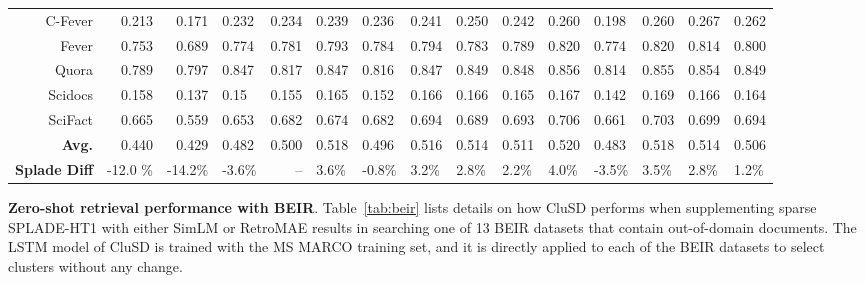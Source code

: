 \begin{table*}[h]
{\begin{tabular}{r r r lr  |lllll|lllll}
                {C-Fever}	& 0.213 & 0.171  &  0.232&0.234 & {0.239} &0.236&  0.241 & 0.250 & 0.242 & 0.260 &0.198 &0.260 &0.267& 0.262\\
                {Fever} & 0.753  &0.689  &	 0.774& {0.781} & 0.793 &0.784&  0.794 & 0.783 & 0.789 & 0.820 &0.774 &0.820 &0.814& 0.800\\
                {Quora} & 0.789 & 0.797  &	 0.847&0.817 &	0.847 &0.816&  0.847 & 0.849 &0.848 & 0.856 &0.814 &0.855 &0.854& 0.849\\
                {Scidocs}	& 0.158 &0.137  &	 0.15&0.155 &	{0.165} &0.152&  0.166 & 0.166 & 0.165 & 0.167 &0.142 &0.169&0.166& 0.164\\
                {SciFact}	& 0.665 & 0.559  &  0.653& {0.682} & 0.674 &0.682&  0.694 & 0.689 & 0.693 & 0.706  &0.661 &0.703 &0.699& 0.694\\
                            \hline
                \textbf{Avg.} & 0.440 & 0.429  &  0.482&0.500 & 0.518 &0.496&  0.516 & 0.514 & 0.511 & 0.520 &0.483 &0.518 &0.514& 0.506\\
                \textbf{{Splade Diff}} & -12.0 \% &  -14.2\%  &	 -3.6\% &-- & 3.6\% & -0.8\% &3.2\% & 2.8\% & 2.2\% &4.0\%& -3.5\%& 3.5\%&2.8\%&1.2\%\\
            \hline\hline
		\end{tabular}
		}
	\caption{Zero-shot performance in average NDCG@10 on BEIR datasets. 
}
  \vspace*{-5mm}
	\label{tab:beir}

\end{table*}


{\bf Zero-shot retrieval performance with BEIR}.
\label{sect:evalbeir}
Table~\ref{tab:beir} lists  details on how  CluSD  performs when supplementing sparse SPLADE-HT1 with either SimLM or RetroMAE results in
searching one of  13 BEIR datasets that contain out-of-domain documents.
The LSTM model of CluSD  is trained with the  MS MARCO training set,
and it is directly applied to each of the BEIR  datasets to select clusters without any change. 


